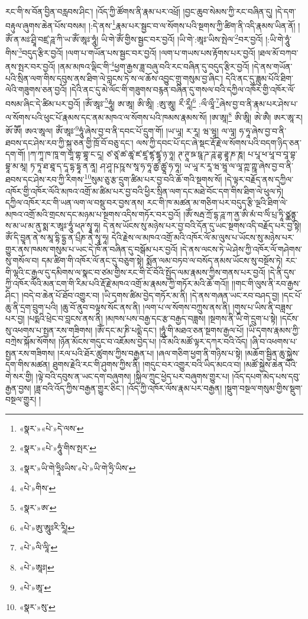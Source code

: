 རང་གི་ས་བོན་བྱིན་བརླབས་ཤིང་། །འོད་ཀྱི་ཚོགས་ནི་རྣམ་པར་འཕྲོ། །བྱང་ཆུབ་སེམས་ཀྱི་རང་བཞིན་དུ། །དེ་དག་བརྟུལ་ཞུགས་ཆེན་པོས་བསམ། །:དེ་ནས་\footnote{«སྣར་»«པེ་»དེ་ལས་}རྣམ་པར་སྦྱང་བ་ལ་སོགས་པའི་སྔགས་ཀྱི་ཚིག་ནི་འདི་རྣམས་ཡིན་ནོ། །ཨོཾ་ན་མཿ་ཤྲཱི་བཛྲ་ཌཱ་ཀི་ཡ་ཨོཾ་ཨཱཿ་ཧཱུཾ། ཡི་གེ་ཨོཾ་གྱིས་སྦྱང་བར་བྱའོ། །ཡི་གེ་:ཨཱཿ་ཡིས་སྤེལ་\footnote{«སྣར་»«པེ་»ཧཱུཾ་གིས་སྤར་}བར་བྱའོ། །:ཡི་གེ་ཧཱུཾ་གིས་\footnote{«སྣར་»ཡི་གེ་ཧྲཱིཿཡིས་«པེ་»ཡི་གེ་ཧྲི་ཡིས་}བདུད་རྩིར་བྱའོ། །ལག་པ་གཡོན་པས་སྦྱང་བར་བྱའོ། །ལག་པ་གཡས་པས་རྟོགས་པར་བྱའོ། །ཐལ་མོ་བཀབ་ནས་སྤར་བར་བྱའོ། །ནམ་མཁའ་ལྡིང་གི་\footnote{«པེ་»གིས་}ཕྱག་རྒྱས་ཟླ་བཞུ་བའི་རང་བཞིན་དུ་བདུད་རྩིར་བྱའོ། །དེ་ནས་གཡོན་པའི་སྲིན་ལག་གིས་དབུས་ནས་ཐིག་ལེ་བླངས་ཏེ་ས་ལ་ཆོས་འབྱུང་གྲུ་གསུམ་བྱ་ཞིང་། དེའི་ནང་དུ་ཟླུམ་པོའི་ཐིག་ལེའི་གཟུགས་ཅན་བྱའོ། །དེའི་ནང་དུ་མེ་ལོང་གི་གཟུགས་བརྙན་བཞིན་དུ་གསལ་བའི་དཀྱིལ་འཁོར་གྱི་འཁོར་ལོ་བསམ་ཞིང་དེ་ཚིམ་པར་བྱའོ། །ཨོཾ་ཨཱཿ་\footnote{«སྣར་»ཨ་}ཧཱུཾ། ཨ་ཨཱ། ཨི་ཨཱི། :ཨུ་ཨཱུ། རྀ་རཱྀ།\footnote{«པེ་»ཨུ་ཨཱུཿརི་རཱི།} :ལྀ་ལཱྀ་\footnote{«པེ་»ལི་ལཱི་}ཞེས་བྱ་བ་ནི་རྣམ་པར་ཤེས་པ་ལ་སོགས་པའི་ཕུང་པོ་རྣམས་དང་ནམ་མཁའ་ལ་སོགས་པའི་ཁམས་རྣམས་སོ། །ཨ་ཨཱ།\footnote{«པེ་»ཨཱཿ།} ཨི་ཨཱི། ཨེ་ཨཻ། ཨར་ཨཱ་ར། ཨོ་ཨཽ། ཨའ་ཨཱལ། ཨོཾ་ཨཱཿ་\footnote{«པེ་»ཨཱ་}ཧཱུཾ་ཞེས་བྱ་བ་ནི་དབང་པོ་དྲུག་གོ། །ཡ་ཡཱ། ར་རཱ། ཝ་ཝཱ། ལ་ལཱ། ཧ་ཧཱ་ཞེས་བྱ་བ་ནི་ཐབས་དང་ཤེས་རབ་ཀྱི་སྐུ་ཅན་གྱི་ཁྲོ་བོ་བཅུ་དང་། ལས་ཀྱི་དབང་པོ་དང་ཞེ་སྡང་རྡོ་རྗེ་ལ་སོགས་པའི་བདག་ཉིད་ཅན་དག་གོ། །ཀ་ཀཱ་ཁ་ཁཱ་ག་གཱ་གྷ་གྷཱ་ང་ངཱ། ཙ་ཙཱ་ཚ་ཚཱ་ཛ་ཛཱ་ཛྷ་ཛྷཱ་ཉ་ཉཱ། ཊ་ཊཱ་ཋ་ཋཱ་ཌ་ཌཱ་ཌྷ་ཌྷཱ་ཎ་ཎཱ། པ་པཱ་ཕ་ཕཱ་བ་བཱ་བྷ་བྷཱ་མ་མཱ། ཏ་ཏཱ་ཐ་ཐཱ་ད་དཱ་དྷ་དྷཱ་ན་ནཱ། ཤ་ཤཱ་ཥ་ཥཱ་ས་སཱ་ཧ་ཧཱ་ཚྱ་ཚྱཱ་ཧ་ཧཱ། ཡ་ཡཱ་ར་རཱ་ཝ་ཝཱ་ལ་ལཱ་ཀྵ་ཀྵཱ་ཞེས་བྱ་བ་ནི་ཐབས་དང་ཤེས་རབ་ཀྱི་རིགས་\footnote{«སྣར་»སུ་}སུམ་ཅུ་རྩ་དྲུག་ཚིམ་པར་བྱ་བའི་ཆོ་གའི་སྔགས་སོ། །དེ་ལྟར་བརྗོད་ནས་དཀྱིལ་འཁོར་གྱི་འཁོར་ལོའི་མཁའ་འགྲོ་མ་ཚིམ་པར་བྱ་བའི་ཕྱིར་སྲིན་ལག་དང་མཐེ་བོང་དག་གིས་ཐིག་ལེ་ཕུལ་ཏེ། དཀྱིལ་འཁོར་རང་གི་ཡན་ལག་ལ་བསྡུ་བར་བྱས་ནས། རང་གི་ཁ་མཚན་མ་གཅིག་པར་བདུད་རྩི་ལྔའི་ཐིག་ལེ་མཁའ་འགྲོ་མའི་གྲངས་དང་མཉམ་པ་སྔགས་འདིས་གཏོར་བར་བྱའོ། །ཨོཾ་སརྦ་ཀྲོ་དྷ་ཌཱ་ཀ་ནྱ་ཨི་མཾ་བ་ལིཾ་པྲ་ཏཱི་ཙྪནྟུ་ས་མ་ཡ་མ་ནུ་སྨ་ར་ཨཱཿ་ཧཱུཾ་ཕཊ་སྭཱ་ཧཱ། དེ་ནས་ཡོངས་སུ་མཉེས་པར་བྱ་བའི་དོན་དུ་ཡང་སྔགས་འདི་བརྗོད་པར་བྱ་སྟེ། ཨོཾ་དི་བྱཱན་ནེ་ས་མཱ་དྷི་དྷྱ་ན་པྲྀཎ་ནེ་སྭཱ་ཧཱ། དེའི་རྗེས་ལ་མཁའ་འགྲོ་མའི་འཁོར་ལོ་མ་ལུས་པ་ཡོངས་སུ་མཉེས་པར་གྱུར་ནས་ཁམས་གསུམ་པ་ཡང་དེ་ཁོ་ན་བཞིན་དུ་བསྒོམ་པར་བྱའོ། །དེ་ནས་ལངས་ཏེ་ཡེ་ཤེས་ཀྱི་འཁོར་ལོ་གཤེགས་སུ་གསོལ་བ། དམ་ཚིག་གི་འཁོར་ལོ་ནང་དུ་བཅུག་སྟེ། སྨོན་ལམ་བཏབ་ལ་བསོད་ནམས་ཡོངས་སུ་བསྔོས་ཏེ། རང་གི་ལྷའི་ང་རྒྱལ་དུ་དམིགས་ལ་སྣང་བ་ཙམ་གྱིས་རང་གི་ངོ་བོའི་སྤྱོད་ལམ་རྣམས་ཀྱིས་གནས་པར་བྱའོ། །དེ་ནི་དུས་ཀྱི་འཁོར་ལོའི་མན་ངག་གི་རིམ་པའི་རྡོ་རྗེ་མཁའ་འགྲོ་མ་རྣམས་ཀྱི་གཏོར་མའི་ཆོ་གའོ།། །།གང་གི་ལུས་ནི་རབ་རྒྱས་ཤིང་། །བདེ་བ་ཆེན་པོ་ཐོབ་འགྱུར་བ། །ཡི་དྭགས་ཚིམ་བྱེད་གཏོར་མ་ནི། །དེ་ནས་གཞན་ཡང་རབ་བཤད་བྱ། །དང་པོ་ཆུ་ནི་དྲག་བྲུག་པའི། །ཆུ་བོ་ནུབ་བལྟས་སོང་ནས་ནི། །ལག་པ་ལ་སོགས་བཀྲུས་ནས་ནི། །གུས་པ་ཡིས་ནི་བཟླས་པར་བྱ། །པདྨའི་ཕྲེང་བ་བླངས་ནས་ནི། །མཁས་པས་བརྒྱ་དང་རྩ་བརྒྱད་བཟླས། །སྔགས་ནི་ཡི་གེ་དྲུག་པ་སྟེ། །དངོས་སུ་འཕགས་པ་སྤྱན་རས་གཟིགས། །ཨོཾ་དང་མ་ཎི་པདྨེ་དང་། །ཧཱུཾ་གི་མཐའ་ཅན་སྔགས་རྒྱལ་པོ། །ཡི་དྭགས་རྣམས་ཀྱི་བཀྲེས་སྐོམ་སོགས། །ཉོན་མོངས་གདུང་བ་འཇོམས་བྱེད་པ། །འོ་མའི་མཚོ་ལྟར་དཀར་བའི་འོད། །ཞི་བ་འཕགས་པ་སྤྱན་རས་གཟིགས། །རལ་པའི་ཐོར་ཚུགས་ཀྱིས་བརྒྱན་པ། །ཞལ་གཅིག་ཕྱག་ནི་གཉིས་པ་སྟེ། །མཆོག་སྦྱིན་ཆུ་སྐྱེས་དག་གིས་མཚན། ཐུགས་རྗེའི་རང་གི་ཤུགས་ཀྱིས་ནི། །གདུང་བར་འགྱུར་བའི་ཡིད་མངའ་བ། །མཚོ་སྐྱེས་ཆེན་པོའི་གེ་སར་གྱི། །ལྟེ་བའི་དབུས་ན་ཡང་དག་བཞུགས། །སྐྱིལ་ཀྲུང་ཕྱེད་པར་བཞུགས་གྱུར་པ། །འོད་དཔག་མེད་པས་དབུ་རྒྱན་བྱས། །ཟླ་བའི་འོད་ཀྱིས་བརྒྱན་གྱུར་ཅིང་། །འོད་ཀྱི་འཁོར་ལོས་རྣམ་པར་བརྒྱན། །སྡུག་བསྔལ་གསུམ་གྱིས་སྡུག་བསྔལ་གྱུར། །
